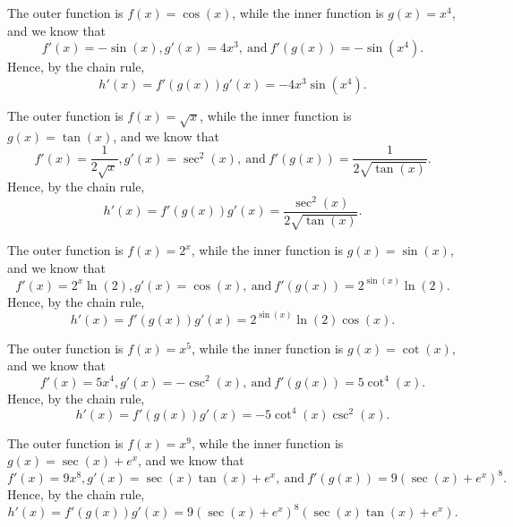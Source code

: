 \begin{activitySolution}
\ba
	   \item The outer function is $f(x) = \cos(x)$, while the inner function is $g(x) = x^4$, and we know that 
	   $$f'(x) = -\sin(x), g'(x) = 4x^3, \ \mbox{and} \ f'(g(x)) = -\sin(x^4).$$
	   Hence, by the chain rule,
	   $$h'(x) = f'(g(x))g'(x) = -4x^3\sin(x^4).$$
	   \item The outer function is $f(x) = \sqrt{x}$, while the inner function is $g(x) = \tan(x)$, and we know that 
	   $$f'(x) = \frac{1}{2\sqrt{x}}, g'(x) = \sec^2(x), \ \mbox{and} \ f'(g(x)) = \frac{1}{2\sqrt{\tan(x)}}.$$
	   Hence, by the chain rule,
	   $$h'(x) = f'(g(x))g'(x) = \frac{\sec^2(x)}{2\sqrt{\tan(x)}}.$$
           \item The outer function is $f(x) = 2^x$, while the inner function is $g(x) = \sin(x)$, and we know that 
	   $$f'(x) = 2^x \ln(2), g'(x) = \cos(x), \ \mbox{and} \ f'(g(x)) = 2^{\sin(x)}\ln(2).$$
	   Hence, by the chain rule,
	   $$h'(x) = f'(g(x))g'(x) = 2^{\sin(x)}\ln(2)\cos(x).$$
           \item The outer function is $f(x) = x^5$, while the inner function is $g(x) = \cot(x)$, and we know that 
	   $$f'(x) = 5x^4, g'(x) = -\csc^2(x), \ \mbox{and} \ f'(g(x)) = 5\cot^4(x).$$
	   Hence, by the chain rule,
	   $$h'(x) = f'(g(x))g'(x) = -5\cot^4(x) \csc^2(x).$$
           \item The outer function is $f(x) = x^9$, while the inner function is $g(x) = \sec(x) + e^x$, and we know that 
	   $$f'(x) = 9x^8, g'(x) = \sec(x)\tan(x) + e^x, \ \mbox{and} \ f'(g(x)) = 9(\sec(x)+e^x)^8.$$
	   Hence, by the chain rule,
	   $$h'(x) = f'(g(x))g'(x) = 9(\sec(x)+e^x)^8 (\sec(x)\tan(x) + e^x).$$
\ea
\end{activitySolution}
\aftera